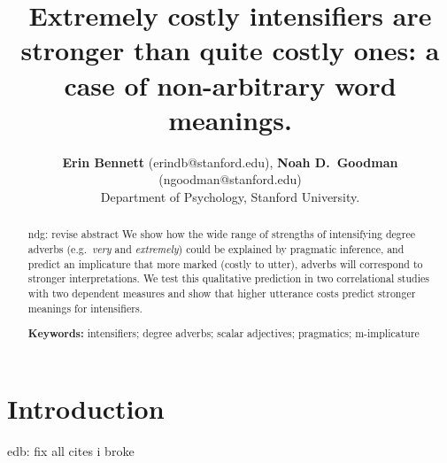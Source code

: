 \documentclass[10pt,letterpaper]{article}
\title{Extremely costly intensifiers are stronger than quite costly ones: a case of non-arbitrary word meanings.}
\author{{\large \bf Erin Bennett} (erindb@stanford.edu), {\large \bf Noah D.~Goodman} (ngoodman@stanford.edu)\\
  Department of Psychology, Stanford University.}
\newcommand{\w}[1]{\emph{#1}}
\newcommand{\todo}[1]{{\color{red}#1}}
\begin{document}
\maketitle

\begin{abstract}

\todo{ndg: revise abstract}
We show how the wide range of strengths of intensifying degree adverbs (e.g.~\w{very} and \w{extremely}) could be explained by pragmatic inference, and predict an implicature that more marked (costly to utter), adverbs will correspond to stronger interpretations. We test this qualitative prediction in two correlational studies with two dependent measures and show that higher utterance costs predict stronger meanings for intensifiers.

\textbf{Keywords:} 
intensifiers; degree adverbs; scalar adjectives; pragmatics; m-implicature
\end{abstract}

\section{Introduction}

\todo{edb: fix all cites i broke}
\end{document}
